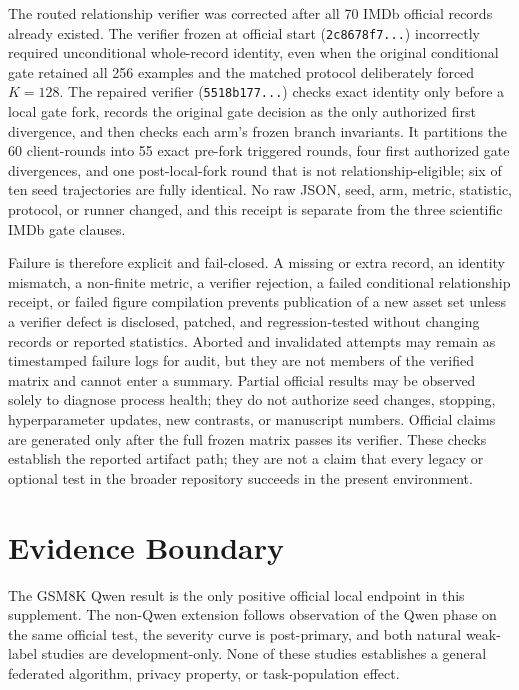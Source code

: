 \documentclass[letterpaper]{article}
\begin{document}
The routed relationship verifier was corrected after all 70 IMDb official
records already existed.  The verifier frozen at official start
(\texttt{2c8678f7...}) incorrectly required unconditional whole-record
identity, even when the original conditional gate retained all 256 examples and
the matched protocol deliberately forced \(K=128\).  The repaired verifier
(\texttt{5518b177...}) checks exact identity only before a local gate fork,
records the original gate decision as the only authorized first divergence, and
then checks each arm's frozen branch invariants.  It partitions the 60
client-rounds into 55 exact pre-fork triggered rounds, four first authorized
gate divergences, and one post-local-fork round that is not
relationship-eligible; six of ten seed trajectories are fully identical.  No
raw JSON, seed, arm, metric, statistic, protocol, or runner changed, and this
receipt is separate from the three scientific IMDb gate clauses.

Failure is therefore explicit and fail-closed.  A missing or extra record, an
identity mismatch, a non-finite metric, a verifier rejection, a failed
conditional relationship receipt, or failed figure compilation prevents
publication of a new asset set unless a verifier defect is disclosed, patched,
and regression-tested without changing records or reported statistics.  Aborted
and invalidated attempts may remain as timestamped failure logs for audit, but
they are not members of the verified matrix and cannot enter a summary.
Partial official results may be observed solely to diagnose process health;
they do not authorize seed changes, stopping, hyperparameter updates, new
contrasts, or manuscript numbers.  Official claims are generated only after the
full frozen matrix passes its verifier.  These checks establish the reported
artifact path; they are not a claim that every legacy or optional test in the
broader repository succeeds in the present environment.

\section{Evidence Boundary}
The GSM8K Qwen result is the only positive official local endpoint in this
supplement.  The non-Qwen extension follows observation of the Qwen phase on
the same official test, the severity curve is post-primary, and both natural
weak-label studies are development-only.  None of these studies establishes a
general federated algorithm, privacy property, or task-population effect.

\begingroup
\small

\endgroup
\end{document}
